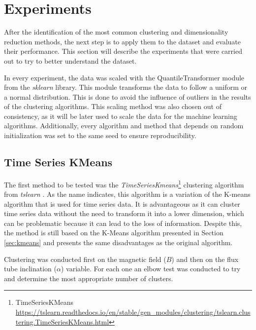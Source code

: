\section{Experiments}\label{sec:clustering_experiments}
After the identification of the most common clustering and dimensionality reduction methods, the next step is to apply them to the dataset and evaluate their performance. This section will describe the experiments that were carried out to try to better understand the dataset. 

In every experiment, the data was scaled with the QuantileTransformer module from the \textit{sklearn} \cite{scikit-learn} library. This module transforms the data to follow a uniform or a normal distribution. This is done to avoid the influence of outliers in the results of the clustering algorithms. This scaling method was also chosen out of consistency, as it will be later used to scale the data for the machine learning algorithms. Additionally, every algorithm and method that depends on random initialization was set to the same seed to ensure reproducibility.

\subsection{Time Series KMeans}\label{sec:time_series_methods}
The first method to be tested was the \textit{TimeSeriesKmeans}\footnote{TimeSeriesKMeans \url{https://tslearn.readthedocs.io/en/stable/gen_modules/clustering/tslearn.clustering.TimeSeriesKMeans.html}} clustering algorithm from \textit{tslearn} \cite{tslearn}. As the name indicates, this algorithm is a variation of the K-means algorithm that is used for time series data. It is advantageous as it can cluster time series data without the need to transform it into a lower dimension, which can be problematic because it can lead to the loss of information. Despite this, the method is still based on the K-Means algorithm presented in Section \ref{sec:kmeans} and presents the same disadvantages as the original algorithm. 

Clustering was conducted first on the magnetic field ($B$) and then on the flux tube inclination ($\alpha$) variable. For each one an elbow test was conducted to try and determine the most appropriate number of clusters. 

